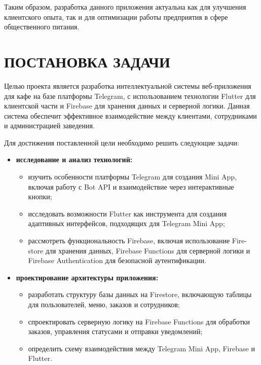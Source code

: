 {{        Таким образом, разработка данного приложения актуальна как для улучшения клиентского опыта, так и для оптимизации работы предприятия в сфере общественного питания.
    }

    \newpage
    \section{\MakeUppercase{Постановка задачи}}

    Целью проекта является разработка интеллектуальной системы веб-приложения для кафе на базе платформы Telegram, с использованием технологии Flutter для клиентской части и Firebase для хранения данных и серверной логики. Данная система обеспечит эффективное взаимодействие между клиентами, сотрудниками и администрацией заведения.

    Для достижения поставленной цели необходимо решить следующие задачи:  
    \begin{itemize}
        \item \textbf{исследование и анализ технологий:}
        \begin{itemize}
            \item изучить особенности платформы Telegram для создания Mini App, включая работу с Bot API и взаимодействие через интерактивные кнопки;
            \item исследовать возможности Flutter как инструмента для создания адаптивных интерфейсов, подходящих для Telegram Mini App;
            \item рассмотреть функциональность Firebase, включая использование Fire-store для хранения данных, Firebase Functions для серверной логики и Firebase Authentication для безопасной аутентификации.
        \end{itemize}

        \item \textbf{проектирование архитектуры приложения:}
        \begin{itemize}
            \item разработать структуру базы данных на Firestore, включающую таблицы для пользователей, меню, заказов и сотрудников;
            \item спроектировать серверную логику на Firebase Functions для обработки заказов, управления статусами и отправки уведомлений;
            \item определить схему взаимодействия между Telegram Mini App, Firebase и Flutter.
        \end{itemize}


\end{itemize}}
